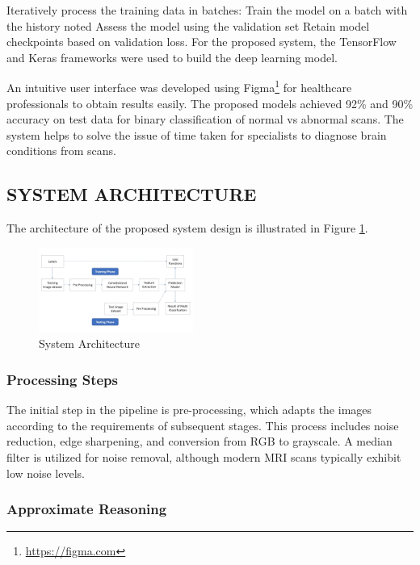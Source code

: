 \documentclass[conference]{IEEEtran}
\begin{document}
Iteratively process the training data in batches: Train the model on a batch with the history noted Assess the model using the validation set Retain model checkpoints based on validation loss. 
For the proposed system, the TensorFlow and Keras frameworks were used to build the deep learning model. 

An intuitive user interface was developed using Figma\footnote{\url{https://figma.com}} for healthcare professionals to obtain results easily. 
The proposed models achieved 92\% and 90\% accuracy on test data for binary classification of normal vs abnormal scans. 
The system helps to solve the issue of time taken for specialists to diagnose brain conditions from scans. 

\subsection{SYSTEM ARCHITECTURE}

The architecture of the proposed system design is illustrated in Figure \ref{fig:sys_arch}.

\begin{figure}
    \centering
    \includegraphics[width=0.45\textwidth]{figures/9.jpg}
    \caption{System Architecture}
    \label{fig:sys_arch}
\end{figure}

\subsubsection{Processing Steps}

The initial step in the pipeline is pre-processing, which adapts the images according to the requirements of subsequent stages. 
This process includes noise reduction, edge sharpening, and conversion from RGB to grayscale. A median filter is utilized for noise removal, although modern MRI scans typically exhibit low noise levels.

\subsubsection{Approximate Reasoning}
\end{document}
